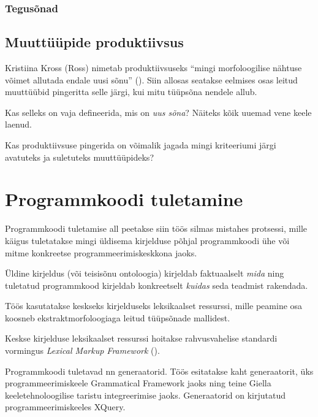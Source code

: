 \documentclass[12pt,a4paper]{article}
\begin{document}
\subsubsection{Tegusõnad}



\subsection{Muuttüüpide produktiivsus}

Kristiina Kross (Ross) nimetab produktiivsuseks ``mingi morfoloogilise nähtuse võimet allutada endale uusi sõnu'' (\cite{kross_eesti_1984}). Siin allosas seatakse eelmises osas leitud muuttüübid pingeritta selle järgi, kui mitu tüüpsõna nendele allub.

Kas selleks on vaja defineerida, mis on \textit{uus sõna}? Näiteks kõik uuemad vene keele laenud.

Kas produktiivsuse pingerida on võimalik jagada mingi kriteeriumi järgi avatuteks ja suletuteks muuttüüpideks?





\newpage
\section{Programmkoodi tuletamine}
\label{sec:programmkoodi-tuletamine}

Programmkoodi tuletamise all peetakse siin töös silmas mistahes protsessi, mille käigus tuletatakse mingi üldisema kirjelduse põhjal programmkoodi ühe või mitme konkreetse programmeerimiskeskkona jaoks.

Üldine kirjeldus (või teisisõnu ontoloogia) kirjeldab faktuaalselt \textit{mida} ning tuletatud programmkood kirjeldab konkreetselt \textit{kuidas} seda teadmist rakendada.

Töös kasutatakse keskseks kirjelduseks leksikaalset ressurssi, mille peamine osa koosneb ekstraktmorfoloogiaga leitud tüüpsõnade mallidest.

Keskse kirjelduse leksikaalset ressurssi hoitakse rahvusvahelise standardi vormingus \textit{Lexical Markup Framework} (\cite{iso/tc_37/sc_4_language_2007}).

Programmkoodi tuletavad nn generaatorid. Töös esitatakse kaht generaatorit, üks programmeerimiskeele Grammatical Framework jaoks ning teine Giella keeletehnoloogilise taristu integreerimise jaoks. Generaatorid on kirjutatud programmeerimiskeeles XQuery.
\end{document}
